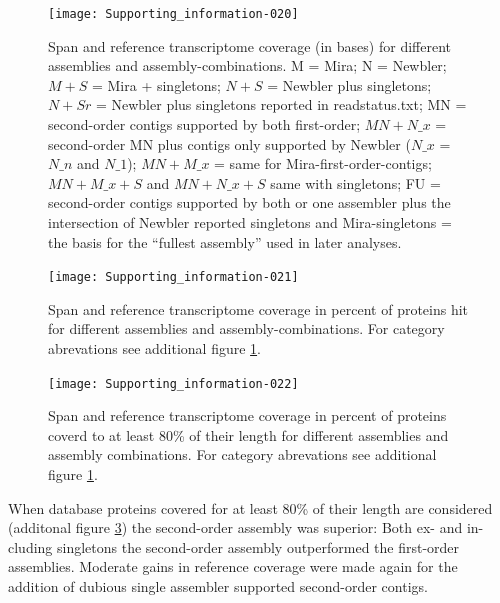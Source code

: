 \documentclass[12pt,a4paper]{article}
\begin{document}
\begin{figure}

\texttt{[image: Supporting\_information-020]}
\caption[Span and reference transcriptome coverage (in bases)]{Span
  and reference transcriptome coverage (in bases) for different
  assemblies and assembly-combinations. M = Mira; N = Newbler; $M+S$ =
  Mira + singletons; $N+S$ = Newbler plus singletons; $N+Sr$ = Newbler
  plus singletons reported in readstatus.txt; MN = second-order
  contigs supported by both first-order; $MN+N\_x$ = second-order MN
  plus contigs only supported by Newbler ($N\_x$ = $N\_n$ and $N\_1$);
  $MN+M\_x$ = same for Mira-first-order-contigs; $MN+M\_x+S$ and
  $MN+N\_x+S$ same with singletons; FU = second-order contigs
  supported by both or one assembler plus the intersection of Newbler
  reported singletons and Mira-singletons = the basis for the
  ``fullest assembly'' used in later analyses.}
\label{fig:basecov}
\end{figure}


\begin{figure}

\texttt{[image: Supporting\_information-021]}
\caption[Span and reference transcriptome coverage in percent of
proteins hit]{Span and reference transcriptome coverage in percent of
  proteins hit for different assemblies and assembly-combinations. For
  category abrevations see additional figure \ref{fig:basecov}.}
\label{fig:protcov}
\end{figure}

\begin{figure}

\texttt{[image: Supporting\_information-022]}
\caption[Span and reference transcriptome coverage in percent of
proteins coverd to at least 80\% of their length]{Span and reference
  transcriptome coverage in percent of proteins coverd to at least
  80\% of their length for different assemblies and assembly
  combinations. For category abrevations see additional figure
  \ref{fig:basecov}.}
\label{fig:prot80cov}
\end{figure}

When database proteins covered for at least 80\% of their length are
considered (additonal figure \ref{fig:prot80cov}) the second-order
assembly was superior: Both ex- and in-cluding singletons the
second-order assembly outperformed the first-order
assemblies. Moderate gains in reference coverage were made again for
the addition of dubious single assembler supported second-order
contigs. 
\end{document}
